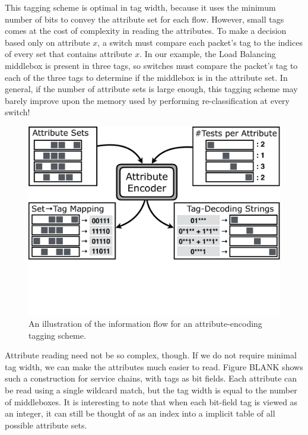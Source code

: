 This tagging scheme is optimal in tag width, because it uses the minimum number of bits to convey the attribute set for each flow. However, small tags comes at the cost of complexity in reading the attributes.  To make a decision based only on attribute $x$, a switch must compare each packet's tag to the indices of every set that contains attribute $x$. In our example, the Load Balancing middlebox is present in three tags, so switches must compare the packet's tag to each of the three tags to determine if the middlebox is in the attribute set. In general, if the number of attribute sets is large enough, this tagging scheme may barely improve upon the memory used by performing re-classification at every switch!




\begin{figure}[t!] 
\begin{minipage}{1\linewidth}
\includegraphics[trim={0 8cm 0 0}, clip, width=\linewidth]{figures/system_flow2}
\end{minipage} 
\caption{An illustration of the information flow for an attribute-encoding tagging scheme.}
\label{fig:system_flow}
\end{figure}

Attribute reading need not be so complex, though. If we do not require minimal tag width, we can make the attributes much easier to read. Figure BLANK shows such a construction for service chains, with tags as bit fields. Each attribute can be read using a single wildcard match, but the tag width is equal to the number of middleboxes. It is interesting to note that when each bit-field tag is viewed as an integer, it can still be thought of as an index into a implicit table of all possible attribute sets. 

